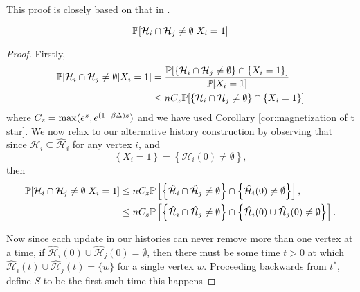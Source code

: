 This proof is closely based on that in \cite{Lubetzky2014-po}.
\begin{lemma}
	\begin{equation}
		\mathbb{P}[\mathcal{H}_i \cap \mathcal{H}_j \neq \emptyset | X_i = 1]
	\end{equation}
\end{lemma}
\begin{proof}
	Firstly,
	\begin{align}
		\mathbb{P}[\mathcal{H}_i \cap \mathcal{H}_j \neq \emptyset | X_i = 1] &= \frac{\mathbb{P}[\left\{\mathcal{H}_i \cap \mathcal{H}_j \neq \emptyset\right\} \cap \{X_i = 1\}]}{\mathbb{P}[X_i = 1]}\\
		&\leq n C_z \mathbb{P}[\left\{\mathcal{H}_i \cap \mathcal{H}_j \neq \emptyset\right\} \cap \{X_i = 1\}]
	\end{align}
	where $C_z = \max(e^{z}, e^{(1 - \beta \Delta)z})$ and we have used Corollary \ref{cor:magnetization of t star}. 
	We now relax to our alternative history construction by observing that since $\mathcal{H}_i \subseteq \hat{\mathcal{H}}_i$ for any vertex $i$, and
	\begin{equation}
		\left\{X_i = 1\right\} = \left\{\mathcal{H}_i(0) \neq \emptyset\right\},
	\end{equation}
	then
	\begin{align}
		\mathbb{P}[\mathcal{H}_i \cap \mathcal{H}_j \neq \emptyset | X_i = 1] &\leq n C_z\mathbb{P}\left[\left\{\hat{\mathcal{H}}_i \cap \hat{\mathcal{H}}_j \neq \emptyset \right\} \cap \left\{\hat{\mathcal{H}}_i(0) \neq \emptyset\right\}\right],\\
		&\leq n C_z\mathbb{P}\left[\left\{\hat{\mathcal{H}}_i \cap \hat{\mathcal{H}}_j \neq \emptyset \right\} \cap \left\{\hat{\mathcal{H}}_i(0) \cup \hat{\mathcal{H}}_j(0) \neq \emptyset\right\}\right].
	\end{align}

	Now since each update in our histories can never remove more than one vertex at a time, if $\hat{\mathcal{H}}_i(0) \cup \hat{\mathcal{H}}_j(0) = \emptyset$, then there must be some time $t > 0$ at which $\hat{\mathcal{H}}_i(t) \cup \hat{\mathcal{H}}_j(t) = \{w\}$ for a single vertex $w$. Proceeding backwards from $t^*$, define $S$ to be the first such time this happens
\end{proof}